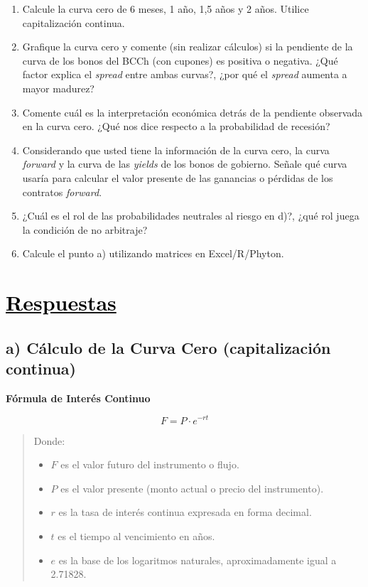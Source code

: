 \documentclass[12pt]{article}
\newcommand{\subrayadoRojo}[1]{{\color{rojoudp}\underline{\textcolor{black}{#1}}}}
\newcommand{\formulasection}[2]{%
    \vspace{1em}
    \noindent
    {\large\bfseries\color{blue}#1}\\[-4em]
    \begin{center}
        \large
      \[
      #2
      \]
    \end{center}
    \vspace{1em}
}
\begin{document}
\begin{enumerate}[label=\textbf{\alph*)}]
    \item Calcule la curva cero de 6 meses, 1 año, 1,5 años y 2 años.
     Utilice capitalización continua.
    
    \item Grafique la curva cero y comente (sin realizar cálculos) si 
    la pendiente de la curva de los bonos del BCCh (con cupones) es 
    positiva o negativa. ¿Qué factor explica el \textit{spread} entre 
    ambas curvas?, ¿por qué el \textit{spread} aumenta a mayor madurez?
    
    \item Comente cuál es la interpretación económica detrás de la 
    pendiente observada en la curva cero. ¿Qué nos dice respecto a 
    la probabilidad de recesión?
    
    \item Considerando que usted tiene la información de la curva cero, 
    la curva \textit{forward} y la curva de las \textit{yields} de los 
    bonos de gobierno. Señale qué curva usaría para calcular el valor 
    presente de las ganancias o pérdidas de los contratos \textit{forward}.
    
    \item ¿Cuál es el rol de las probabilidades neutrales al riesgo en d)?, 
    ¿qué rol juega la condición de no arbitraje?
    
    \item Calcule el punto a) utilizando matrices en Excel/R/Phyton.
\end{enumerate}

\newpage

\section*{\subrayadoRojo{Respuestas}}

\subsection*{a) Cálculo de la Curva Cero (capitalización continua)}

\formulasection{Fórmula de Interés Continuo}{
    F = P \cdot e^{-rt}
}
\vspace{-3em}
\begin{quote}
    \scriptsize
Donde:
\begin{itemize}
    \item $F$ es el valor futuro del instrumento o flujo.
    \item $P$ es el valor presente (monto actual o precio del instrumento).
    \item $r$ es la tasa de interés continua expresada en forma decimal.
    \item $t$ es el tiempo al vencimiento en años.
    \item $e$ es la base de los logaritmos naturales, aproximadamente igual a 2.71828.
\end{itemize}
\end{quote}
\end{document}
